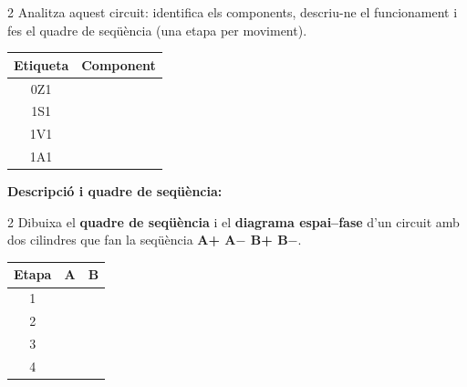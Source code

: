 \begin{exercici}[12]{2}
Analitza aquest circuit: identifica els components, descriu-ne el funcionament i fes el quadre de seqüència (una etapa per moviment).
\begin{center}\circuitE\end{center}
\begin{center}
\renewcommand{\arraystretch}{2.0}
\begin{tabular}{|c|p{10cm}|}\hline
\textbf{Etiqueta} & \textbf{Component}\\\hline 0Z1 & \\\hline 1S1 & \\\hline 1V1 & \\\hline 1A1 & \\\hline
\end{tabular}
\end{center}
\textbf{Descripció i quadre de seqüència:}
\end{exercici}

\begin{exercici}{2}
Dibuixa el \textbf{quadre de seqüència} i el \textbf{diagrama espai--fase} d'un circuit amb dos cilindres que fan la seqüència \textbf{A+ A$-$ B+ B$-$}.
\begin{center}
\renewcommand{\arraystretch}{1.8}
\begin{tabular}{c|cc}
\textbf{Etapa} & \textbf{A} & \textbf{B}\\\hline
1 & \hspace{1cm} & \hspace{1cm}\\\hline 2 & & \\\hline 3 & & \\\hline 4 & & \\
\end{tabular}\qquad\qquad
{}
\end{center}
\end{exercici}

